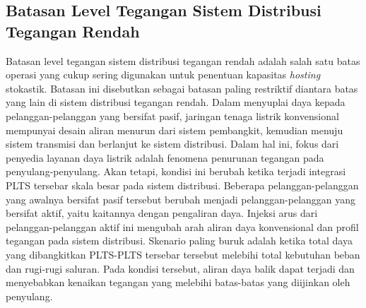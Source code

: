 {\subsection{Batasan Level Tegangan Sistem Distribusi Tegangan Rendah}
Batasan level tegangan sistem distribusi tegangan rendah adalah salah satu batas operasi yang cukup sering digunakan untuk penentuan kapasitas \textit{hosting} stokastik\cite{santos-martin_simplified_2016,silva_stochastic_2016,navarro-espinosa_probabilistic_2016,arshad_analysis_2017,baptista_probabilistic_2019,electric_power_research_institute_stochastic_2012,ding_distributed_2017,bollen_hosting_2017,torquato_comprehensive_2018,deakin_stochastic_2019,vergara_comprehensive_2020}. Batasan ini disebutkan sebagai batasan paling restriktif diantara batas yang lain di sistem distribusi tegangan rendah. Dalam menyuplai daya kepada pelanggan-pelanggan yang bersifat pasif, jaringan tenaga listrik konvensional mempunyai desain aliran menurun dari sistem pembangkit, kemudian menuju sistem transmisi dan berlanjut ke sistem distribusi. Dalam hal ini, fokus dari penyedia layanan daya listrik adalah fenomena penurunan tegangan pada penyulang-penyulang. Akan tetapi, kondisi ini berubah ketika terjadi integrasi PLTS tersebar skala besar pada sistem distribusi. Beberapa pelanggan-pelanggan yang awalnya bersifat pasif tersebut berubah menjadi pelanggan-pelanggan yang bersifat aktif, yaitu kaitannya dengan pengaliran daya. Injeksi arus dari pelanggan-pelanggan aktif ini mengubah arah aliran daya konvensional dan profil tegangan pada sistem distribusi. Skenario paling buruk adalah ketika total daya yang dibangkitkan PLTS-PLTS tersebar tersebut melebihi total kebutuhan beban dan rugi-rugi saluran. Pada kondisi tersebut, aliran daya balik dapat terjadi dan menyebabkan kenaikan tegangan yang melebihi batas-batas yang diijinkan oleh penyulang.

}
